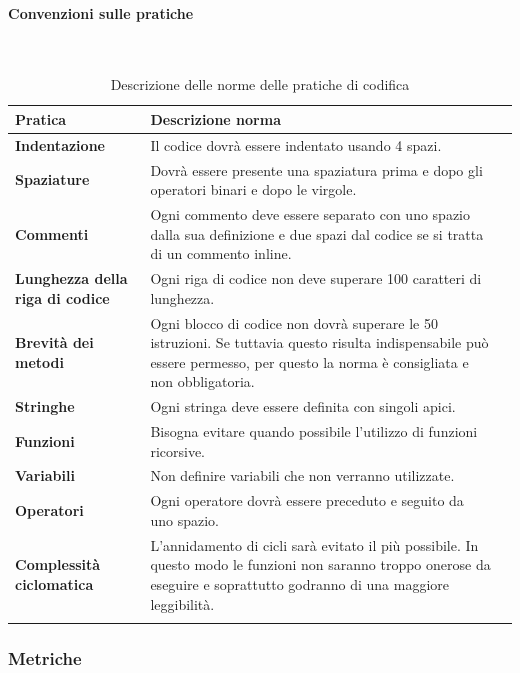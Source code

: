\paragraph*{Convenzioni sulle pratiche}
\
{
	\setlength{\freewidth}{\dimexpr\textwidth-0\tabcolsep}
	\renewcommand{\arraystretch}{1.5}
	\setlength{\aboverulesep}{0pt}
	\setlength{\belowrulesep}{0pt}
	\begin{longtable}{L{.210\freewidth} L{.6\freewidth} L{.080\freewidth}}
		\rowcolor{AzzurroGruppo!30}
		\textbf{Pratica} & \textbf{Descrizione norma} \\
		\toprule
		\endhead		
		\textbf{Indentazione} & Il codice dovrà essere indentato usando 4 spazi. \\ 
		\textbf{Spaziature} & Dovrà essere presente una spaziatura prima e dopo gli operatori binari e dopo le virgole. \\
		\textbf{Commenti} & Ogni commento deve essere separato con uno spazio dalla sua definizione e due spazi dal codice se si tratta di un commento inline. \\ 
		\textbf{Lunghezza della riga di codice} & Ogni riga di codice non deve superare 100 caratteri di lunghezza. \\
		\textbf{Brevità dei metodi} & Ogni blocco di codice non dovrà superare le 50 istruzioni. Se tuttavia questo risulta indispensabile può essere permesso, per questo la norma è consigliata e non obbligatoria.\\ 	
		\textbf{Stringhe} & Ogni stringa deve essere definita con singoli apici. \\
		\textbf{Funzioni} & Bisogna evitare quando possibile l'utilizzo di funzioni ricorsive.\\ 	
		\textbf{Variabili} & Non definire variabili che non verranno utilizzate.\\ 	
		\textbf{Operatori} & Ogni operatore dovrà essere preceduto e seguito da uno spazio.\\ 	
		\textbf{Complessità ciclomatica} & L'annidamento di cicli sarà evitato il più possibile. In questo modo le funzioni non saranno troppo onerose da eseguire e soprattutto godranno di una maggiore leggibilità. \\  			
		\bottomrule
		\hiderowcolors
		\caption{Descrizione delle norme delle pratiche di codifica}
	\end{longtable}
}
\subsubsection*{Metriche}

